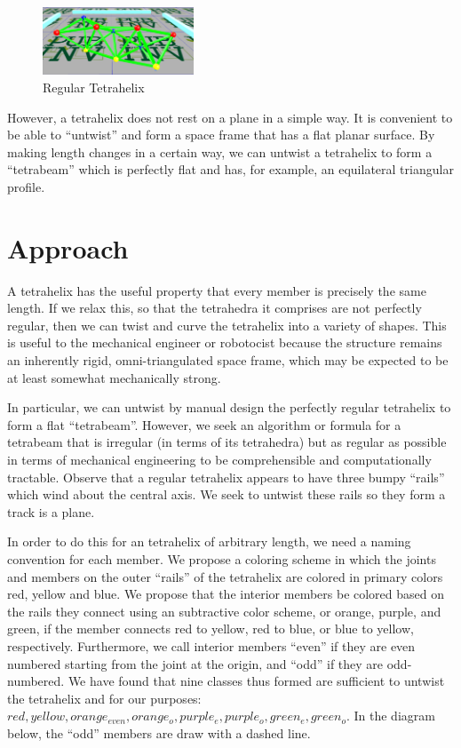 \documentclass[11pt]{article}
\begin{document}
\begin{figure}[H] %
  \centering
     \includegraphics[width=0.4\textwidth]{figures/Tetrahelix0.png}
     \caption{Regular Tetrahelix}
\end{figure}


However, a tetrahelix does not rest on a plane in a simple way. It is convenient to be able to ``untwist'' and form a space frame that
has a flat planar surface. By making length changes in a certain way, we can untwist a tetrahelix to form a ``tetrabeam'' which
is perfectly flat and has, for example, an equilateral triangular profile.

\section{Approach}

A tetrahelix has the useful property that every member is precisely the same length. If we relax this, so that the tetrahedra it
comprises are not perfectly regular, then we can twist and curve the tetrahelix into a variety of shapes. This is useful to
the mechanical engineer or robotocist because the structure remains an inherently rigid, omni-triangulated space frame, which
may be expected to be at least somewhat mechanically strong.

In particular, we can untwist by manual design the perfectly regular tetrahelix to form a flat ``tetrabeam''.
However, we seek an algorithm or formula for a tetrabeam that is irregular
(in terms of its tetrahedra) but as regular as possible in terms of mechanical engineering to be comprehensible and computationally tractable.
Observe that a regular tetrahelix appears to have three bumpy ``rails'' which wind about the central axis.  We seek to untwist
these rails so they form a track is a plane.

In order to do this for an tetrahelix of arbitrary length, we need a naming convention for each member. We propose a coloring
scheme in which the joints and members on the outer ``rails'' of the tetrahelix are colored in primary colors red, yellow and blue.
We propose that the interior members be colored based on the rails they connect using an subtractive color scheme, or orange, purple, and green,
if the member connects red to yellow, red to blue, or blue to yellow, respectively.  Furthermore, we call interior members ``even'' if they
are even numbered starting from the joint at the origin, and ``odd'' if they are odd-numbered.  We have found that nine classes thus
formed are sufficient to untwist the tetrahelix and for our purposes: $red, yellow, orange_{even}, orange_o, purple_e, purple_o, green_e, green_o$. In the diagram below, the ``odd'' members are draw with a dashed line.
\end{document}
